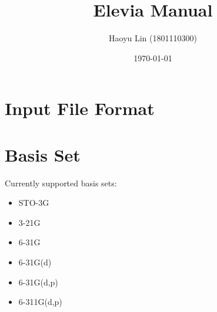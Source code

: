 \documentclass[11pt,a4paper]{article}
\title{Elevia Manual}
\author{Haoyu Lin (1801110300)}
\date{\today}
\begin{document}
	
	\maketitle
	
	\section{Input File Format}
	
	
	\section{Basis Set}
	Currently supported basis sets:
	\begin{itemize}
		\item STO-3G
		\item 3-21G
		\item 6-31G
		\item 6-31G(d)
		\item 6-31G(d,p)
		\item 6-311G(d,p)
	\end{itemize}
	
	
\end{document}

